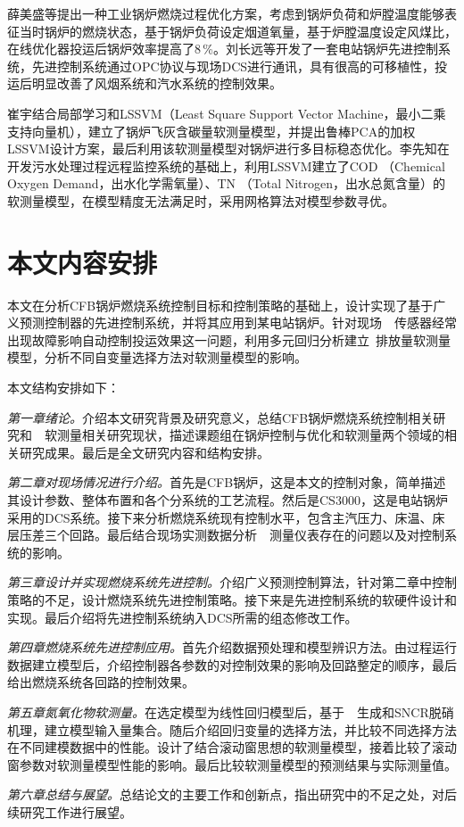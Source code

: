 薛美盛等提出一种工业锅炉燃烧过程优化方案，考虑到锅炉负荷和炉膛温度能够表征当时锅炉的燃烧状态，基于锅炉负荷设定烟道氧量，基于炉膛温度设定风煤比，在线优化器投运后锅炉效率提高了8$\,$\si{\percent}\cite{薛美盛2001工业锅炉在线燃烧优化}。刘长远等开发了一套电站锅炉先进控制系统，先进控制系统通过OPC协议与现场DCS进行通讯，具有很高的可移植性，投运后明显改善了风烟系统和汽水系统的控制效果\cite{刘长远2012电站锅炉先进控制系统的开发与应用}。

崔宇结合局部学习和LSSVM（Least Square Support Vector Machine，最小二乘支持向量机），建立了锅炉飞灰含碳量软测量模型，并提出鲁棒PCA的加权LSSVM设计方案，最后利用该软测量模型对锅炉进行多目标稳态优化\cite{崔宇2009局部}。李先知在开发污水处理过程远程监控系统的基础上，利用LSSVM建立了COD （Chemical Oxygen Demand，出水化学需氧量）、TN （Total Nitrogen，出水总氮含量）的软测量模型，在模型精度无法满足时，采用网格算法对模型参数寻优\cite{李先知2016污水处理过程远程监控系统设计与支持向量机技术应用研究}。

\section{本文内容安排}

本文在分析CFB锅炉燃烧系统控制目标和控制策略的基础上，设计实现了基于广义预测控制器的先进控制系统，并将其应用到某电站锅炉。针对现场~~传感器经常出现故障影响自动控制投运效果这一问题，利用多元回归分析建立~排放量软测量模型，分析不同自变量选择方法对软测量模型的影响。


本文结构安排如下：

\emph{第一章绪论。}介绍本文研究背景及研究意义，总结CFB锅炉燃烧系统控制相关研究和~~软测量相关研究现状，描述课题组在锅炉控制与优化和软测量两个领域的相关研究成果。最后是全文研究内容和结构安排。

\emph{第二章对现场情况进行介绍。}首先是CFB锅炉，这是本文的控制对象，简单描述其设计参数、整体布置和各个分系统的工艺流程。然后是CS3000，这是电站锅炉采用的DCS系统。接下来分析燃烧系统现有控制水平，包含主汽压力、床温、床层压差三个回路。最后结合现场实测数据分析~~测量仪表存在的问题以及对控制系统的影响。

\emph{第三章设计并实现燃烧系统先进控制。}介绍广义预测控制算法，针对第二章中控制策略的不足，设计燃烧系统先进控制策略。接下来是先进控制系统的软硬件设计和实现。最后介绍将先进控制系统纳入DCS所需的组态修改工作。

\emph{第四章燃烧系统先进控制应用。}首先介绍数据预处理和模型辨识方法。由过程运行数据建立模型后，介绍控制器各参数的对控制效果的影响及回路整定的顺序，最后给出燃烧系统各回路的控制效果。

\emph{第五章氮氧化物软测量。}在选定模型为线性回归模型后，基于~~生成和SNCR脱硝机理，建立模型输入量集合。随后介绍回归变量的选择方法，并比较不同选择方法在不同建模数据中的性能。设计了结合滚动窗思想的软测量模型，接着比较了滚动窗参数对软测量模型性能的影响。最后比较软测量模型的预测结果与实际测量值。

\emph{第六章总结与展望。}总结论文的主要工作和创新点，指出研究中的不足之处，对后续研究工作进行展望。

